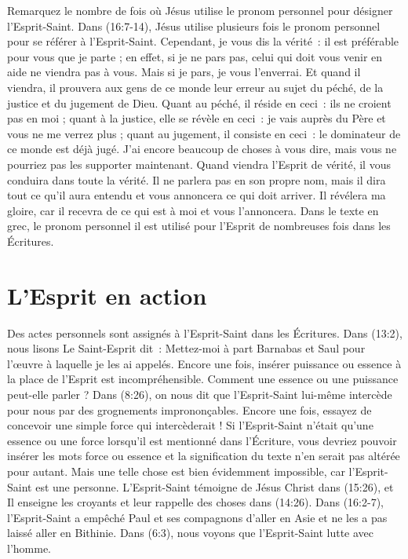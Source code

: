 Remarquez le nombre de fois où Jésus utilise le pronom personnel pour désigner l'Esprit-Saint. Dans (16:7-14), Jésus utilise plusieurs fois le pronom personnel pour se référer à l'Esprit-Saint. \og Cependant, je vous dis la vérité~: il est préférable pour vous que je parte ; en effet, si je ne pars pas, celui qui doit vous venir en aide ne viendra pas à vous. Mais si je pars, je vous l'enverrai. Et quand il viendra, il prouvera aux gens de ce monde leur erreur au sujet du péché, de la justice et du jugement de Dieu. Quant au péché, il réside en ceci~: ils ne croient pas en moi ; quant à la justice, elle se révèle en ceci~: je vais auprès du Père et vous ne me verrez plus ; quant au jugement, il consiste en ceci~: le dominateur de ce monde est déjà jugé. J'ai encore beaucoup de choses à vous dire, mais vous ne pourriez pas les supporter maintenant. Quand viendra l'Esprit de vérité, il vous conduira dans toute la vérité. Il ne parlera pas en son propre nom, mais il dira tout ce qu'il aura entendu et vous annoncera ce qui doit arriver. Il révélera ma gloire, car il recevra de ce qui est à moi et vous l'annoncera. \fg{} Dans le texte en grec, le pronom personnel \og il \fg{} est utilisé pour l'Esprit de nombreuses fois dans les Écritures.

\section*{L'Esprit en action}

Des actes personnels sont assignés à l'Esprit-Saint dans les Écritures. Dans (13:2), nous lisons \og Le Saint-Esprit dit~: Mettez-moi à part Barnabas et Saul pour l'œuvre à laquelle je les ai appelés. \fg{} Encore une fois, insérer \og puissance \fg{} ou \og essence \fg{} à la place de l'Esprit est incompréhensible. Comment une essence ou une puissance peut-elle parler ? Dans (8:26), on nous dit que l'Esprit-Saint lui-même intercède pour nous par des grognements imprononçables. Encore une fois, essayez de concevoir une simple force qui intercèderait ! Si l'Esprit-Saint n'était qu'une essence ou une force lorsqu'il est mentionné dans l'Écriture, vous devriez pouvoir insérer les mots \og force \fg{} ou \og essence \fg{} et la signification du texte n'en serait pas altérée pour autant. Mais une telle chose est bien évidemment impossible, car l'Esprit-Saint est une personne. L'Esprit-Saint témoigne de Jésus Christ dans (15:26), et Il enseigne les croyants et leur rappelle des choses dans (14:26). Dans (16:2-7), l'Esprit-Saint a empêché Paul et ses compagnons d'aller en Asie et ne les a pas laissé aller en Bithinie. Dans (6:3), nous voyons que l'Esprit-Saint lutte avec l'homme.

